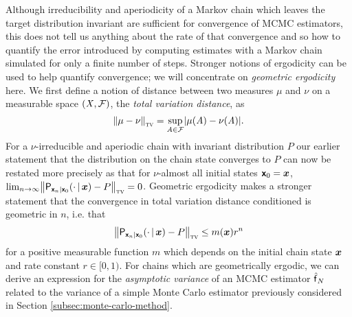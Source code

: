 Although irreducibility and aperiodicity of a Markov chain which leaves the target distribution invariant are sufficient for convergence of \ac{MCMC} estimators, this does not tell us anything about the rate of that convergence and so how to quantify the error introduced by computing estimates with a Markov chain simulated for only a finite number of steps. Stronger notions of ergodicity can be used to help quantify convergence; we will concentrate on \emph{geometric ergodicity} here. We first define a notion of distance between two measures $\mu$ and $\nu$ on a measurable space $(\mathit{X},\mathcal{F})$, the \emph{total variation distance}, as
\begin{equation}\label{eq:total-variation-measures}
  \left\Vert \mu - \nu \right\Vert_{\textsc{tv}} = \sup_{\set{A} \in \sset{F}} \left| \mu(\set{A}) - \nu(\set{A}) \right|.
\end{equation}
For a $\nu$-irreducible and aperiodic chain with invariant distribution $P$ our earlier statement that the distribution on the chain state converges to $P$ can now be restated more precisely as that for $\nu$-almost all initial states $\boldsymbol{\mathsf{x}}_0 = \boldsymbol{x}$, $\lim_{n\to\infty} \left\Vert \prob{\rvct{x}_n|\rvct{x}_0}\lpa \cdot \gvn \vct{x}\rpa - \tgtprob \right\Vert_{\textsc{tv}} = 0$. Geometric ergodicity makes a stronger statement that the convergence in total variation distance conditioned is geometric in $n$, i.e. that
\begin{equation}\label{eq:geometric-ergodicity}
  \left\Vert \prob{\rvct{x}_n|\rvct{x}_0}\lpa \cdot \gvn \vct{x}\rpa - \tgtprob \right\Vert_{\textsc{tv}} \leq m(\vct{x}) r^n
\end{equation}
for a positive measurable function $m$ which depends on the initial chain state $\boldsymbol{x}$ and rate constant $r \in [0, 1)$. For chains which are geometrically ergodic, we can derive an expression for the \emph{asymptotic variance} of an \ac{MCMC} estimator $\hatf_N$ related to the variance of a simple Monte Carlo estimator previously considered in Section \ref{subsec:monte-carlo-method}.

